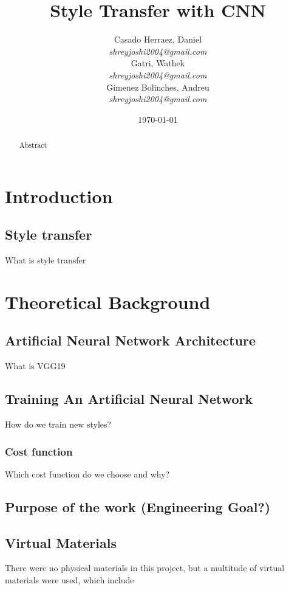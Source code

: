 \documentclass{article}
\title{\textbf{Style Transfer with CNN}}
\author{
  Casado Herraez, Daniel \\
  \textit{shreyjoshi2004@gmail.com} \\
  \And
  Gatri, Wathek \\
  \textit{shreyjoshi2004@gmail.com} \\
  \And
  Gimenez Bolinches, Andreu \\
  \textit{shreyjoshi2004@gmail.com} \\
}
\date{\today}
\begin{document}
    \maketitle
    \begin{abstract} \normalsize

        Abstract

    \end{abstract}


    \clearpage

    \tableofcontents
    \clearpage

    \section{Introduction}
    \subsection{Style transfer}
    What is style transfer

    \section{Theoretical Background}

    \subsection{Artificial Neural Network Architecture}
    What is VGG19

    \subsection{Training An Artificial Neural Network}
    How do we train new styles?

    \subsubsection{Cost function}
    Which cost function do we choose and why?

    \subsection{Purpose of the work (Engineering Goal?)}

    \subsection{Virtual Materials}
    There were no physical materials in this project, but a multitude of virtual materials were used, which include
\end{document}

